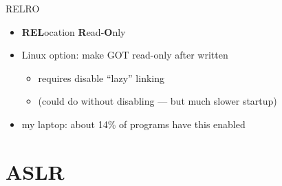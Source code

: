 \begin{frame}{RELRO}
    \begin{itemize}
        \item \textbf{REL}ocation \textbf{R}ead-\textbf{O}nly
        \item Linux option: make GOT read-only after written
            \begin{itemize}
            \item requires disable ``lazy'' linking
            \item (could do without disabling --- but much slower startup)
            \end{itemize}
        \item my laptop: about 14\% of programs have this enabled
    \end{itemize}
\end{frame}

\section{ASLR}

